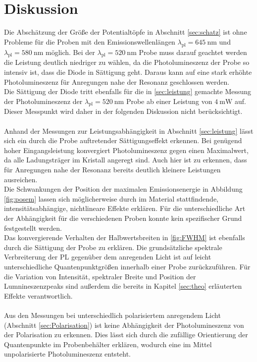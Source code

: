 \section{Diskussion}
Die Abschätzung der Größe der Potentialtöpfe in Abschnitt \ref{sec:schatz} ist ohne Probleme für die Proben mit den Emissionswellenlängen $\lambda_{\text{pl}} = \SI{645}{\nano\meter}$ und $\lambda_{\text{pl}} = \SI{580}{\nano\meter}$ möglich. Bei der $\lambda_{\text{pl}} = \SI{520}{\nano\meter}$ Probe muss darauf geachtet werden die Leistung deutlich niedriger zu wählen, da die Photolumineszenz der Probe so intensiv ist, dass die Diode in Sättigung geht. Daraus kann auf eine stark erhöhte Photolumineszenz für Anregungen nahe der Resonanz geschlossen werden.\\
Die Sättigung der Diode tritt ebenfalls für die in \ref{sec:leistung} gemachte Messung der Photolumineszenz der $\lambda_{\text{pl}} = \SI{520}{\nano\meter}$ Probe ab einer Leistung von $\SI{4}{\milli\watt}$ auf. Dieser Messpunkt wird daher in der folgenden Diskussion nicht berücksichtigt.\\
\\
Anhand der Messungen zur Leistungsabhängigkeit in Abschnitt \ref{sec:leistung} lässt sich ein durch die Probe auftretender Sättigungseffekt erkennen. Bei genügend hoher Eingangsleistung konvergiert Photolumineszenz gegen einen Maximalwert, da alle Ladungsträger im Kristall angeregt sind. Auch hier ist zu erkennen, dass für Anregungen nahe der Resonanz bereits deutlich kleinere Leistungen ausreichen.\\
Die Schwankungen der Position der maximalen Emissionsenergie in Abbildung \ref{fig:posem} lassen sich möglicherweise durch im Material stattfindende, intensitätsabhängige, nichtlineare Effekte erklären. Für die unterschiedliche Art der Abhängigkeit für die verschiedenen Proben konnte kein spezifischer Grund festgestellt werden.\\
Das konvergierende Verhalten der Halbwertsbreiten in \ref{fig:FWHM} ist ebenfalls durch die Sättigung der Probe zu erklären. Die grundsätzliche spektrale Verbreiterung der PL gegenüber dem anregenden Licht ist auf leicht unterschiedliche Quantenpunktgrößen innerhalb einer Probe zurückzuführen. Für die Variation von Intensität, spektraler Breite und Position der Lumnineszenzpeaks sind außerdem die bereits in Kapitel \ref{sec:theo} erläuterten Effekte verantwortlich. \\
\\
Aus den Messungen bei unterschiedlich polarisiertem anregendem Licht (Abschnitt \ref{sec:Polarisation}) ist keine Abhängigkeit der Photolumineszenz von der Polarisation zu erkennen. Dies lässt sich durch die zufällige Orientierung der Quantenpunkte im Probenbehälter erklären, wodurch eine im Mittel unpolarisierte Photolumineszenz entsteht.\\
